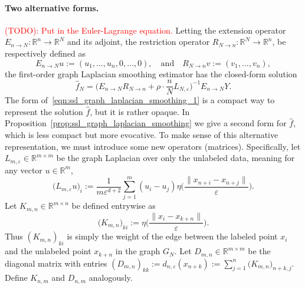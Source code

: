 \documentclass{article}
\newcommand{\Reals}{\mathbb{R}}
\newcommand{\1}{\mathbf{1}}
\newcommand{\wh}[1]{\widehat{#1}}
\theoremstyle{alden}
\theoremstyle{aldenthm}
\theoremstyle{definition}
\theoremstyle{remark}
\begin{document}
\paragraph{Two alternative forms.}
\textcolor{red}{(TODO): Put in the Euler-Lagrange equation.}
Letting the extension operator $E_{n \to N}: \Reals^{n} \to \Reals^N$ and its adjoint, the restriction operator $R_{N \to n}: \Reals^{N} \to \Reals^n$, be respectively defined as
\begin{equation*}
E_{n \to N}u := (u_1,\ldots,u_n,0,\ldots,0),\quad\textrm{and}\quad R_{N \to n}v := (v_1,\ldots,v_n),
\end{equation*}
the first-order graph Laplacian smoothing estimator has the closed-form solution
\begin{equation}
\label{eqn:ssl_graph_laplacian_smoothing_1}
\wh{f}_N = \biggl(E_{n \to N} R_{N \to n} + \rho \cdot \frac{n}{N} L_{N,\varepsilon}\biggr)^{-1} E_{n \to N}Y.
\end{equation}
The form of~\eqref{eqn:ssl_graph_laplacian_smoothing_1} is a compact way to represent the solution $\wh{f}$, but it is rather opaque. In Proposition~\ref{prop:ssl_graph_laplacian_smoothing} we give a second form for $\wh{f}$, which is less compact but more evocative. To make sense of this alternative representation, we must introduce some new operators (matrices). Specifically, let $L_{m,\varepsilon} \in \Reals^{m \times m}$ be the graph Laplacian over only the unlabeled data, meaning for any vector $u \in \Reals^m$,
\begin{equation}
\label{eqn:graph_laplacian_unlabeled}
\bigl(L_{m,\varepsilon}u\bigr)_i := \frac{1}{m \varepsilon^{d + 2}}\sum_{j = 1}^{m} (u_i - u_j) \eta\biggl(\frac{\|x_{n + i} - x_{n + j}\|}{\varepsilon}\biggr).
\end{equation}
Let $K_{m,n} \in \Reals^{m \times n}$ be defined entrywise as
\begin{equation*}
\bigl(K_{m,n}\bigr)_{ki} := \eta\biggl(\frac{\|x_i - x_{k + n}\|}{\varepsilon}\biggr).
\end{equation*}
Thus $(K_{m,n})_{ki}$ is simply the weight of the edge between the labeled point $x_i$ and the unlabeled point $x_{k +n}$ in the graph $G_N$. Let $D_{m,n} \in \Reals^{m \times m}$ be the diagonal matrix with entries $(D_{m,n})_{kk} := d_{n,\varepsilon}(x_{n + k}) := \sum_{j = 1}^{n} \bigl(K_{m,n}\bigr)_{n + k,j}$. Define $K_{n,m}$ and $D_{n,m}$ analogously.
\end{document}

